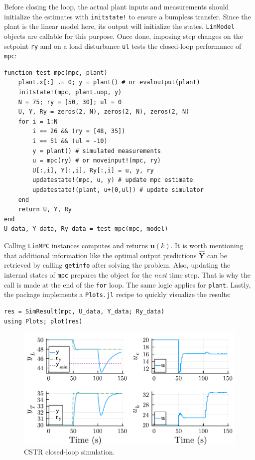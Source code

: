 Before closing the loop, the actual plant inputs and measurements should initialize the estimates with \texttt{initstate!} to ensure a bumpless transfer. Since the plant is the linear model here, its output will initialize the states. \texttt{LinModel} objects are callable for this purpose. Once done, imposing step changes on the setpoint \texttt{ry} and on a load disturbance \texttt{ul} tests the closed-loop performance of \texttt{mpc}:
\begin{verbatim}
function test_mpc(mpc, plant)
    plant.x[:] .= 0; y = plant() # or evaloutput(plant)
    initstate!(mpc, plant.uop, y)
    N = 75; ry = [50, 30]; ul = 0
    U, Y, Ry = zeros(2, N), zeros(2, N), zeros(2, N)
    for i = 1:N
        i == 26 && (ry = [48, 35])
        i == 51 && (ul = -10)
        y = plant() # simulated measurements
        u = mpc(ry) # or moveinput!(mpc, ry)
        U[:,i], Y[:,i], Ry[:,i] = u, y, ry
        updatestate!(mpc, u, y) # update mpc estimate
        updatestate!(plant, u+[0,ul]) # update simulator
    end
    return U, Y, Ry
end
U_data, Y_data, Ry_data = test_mpc(mpc, model)
\end{verbatim}
Calling \texttt{LinMPC} instances computes and returns $\mathbf{u}(k)$. It is worth mentioning that additional information like the optimal output predictions $\mathbf{\hat{Y}}$ can be retrieved by calling \texttt{getinfo} after solving the problem. Also, updating the internal states of \texttt{mpc} prepares the object for the \emph{next} time step. That is why the call is made at the end of the \texttt{for} loop. The same logic applies for \texttt{plant}. Lastly, the package implements a \texttt{Plots.jl} recipe \citep{plots} to quickly visualize the results:
\begin{verbatim}
res = SimResult(mpc, U_data, Y_data; Ry_data)
using Plots; plot(res)
\end{verbatim}

\begin{figure}[h]
    \centering
    \includegraphics[width=\columnwidth]{fig/plot_LinMPC1.pdf}
    \caption{CSTR closed-loop simulation.}
    \label{fig:plot_LinMPC1}
\end{figure}

